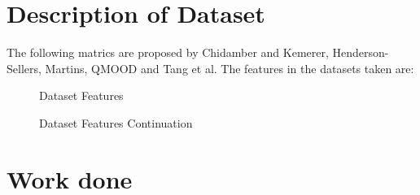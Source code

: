 \section{Description of Dataset}\label{sec2.2}
The following matrics are proposed by Chidamber and Kemerer, Henderson-Sellers, Martins, QMOOD and Tang et al.
The features in the datasets taken are: 
 \begin{figure}
%
  \caption{Dataset Features}
  \label{fig:key}
\end{figure}

 \begin{figure}
%
  \caption{Dataset Features Continuation}
  \label{fig:key}
\end{figure}

\section{Work done}\label{sec2.3}

